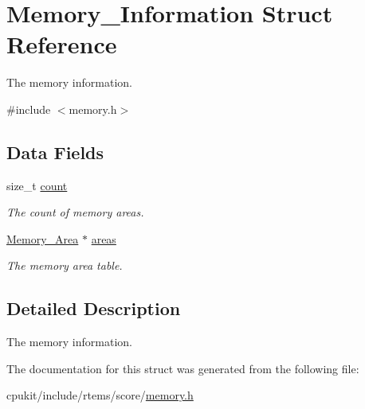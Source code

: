 \hypertarget{structMemory__Information}{}\section{Memory\+\_\+\+Information Struct Reference}
\label{structMemory__Information}


The memory information.  




{\ttfamily \#include $<$memory.\+h$>$}

\subsection*{Data Fields}
\begin{DoxyCompactItemize}
\item 
\mbox{\label{structMemory__Information_ab9e5516c1374c7484cb5d632da95269c}} 
size\+\_\+t \mbox{\hyperlink{structMemory__Information_ab9e5516c1374c7484cb5d632da95269c}{count}}
\begin{DoxyCompactList}\small\item\em The count of memory areas. \end{DoxyCompactList}\item 
\mbox{\label{structMemory__Information_a01619293117965934d3b2e265291da81}} 
\mbox{\hyperlink{structMemory__Area}{Memory\+\_\+\+Area}} $\ast$ \mbox{\hyperlink{structMemory__Information_a01619293117965934d3b2e265291da81}{areas}}
\begin{DoxyCompactList}\small\item\em The memory area table. \end{DoxyCompactList}\end{DoxyCompactItemize}


\subsection{Detailed Description}
The memory information. 

The documentation for this struct was generated from the following file\+:\begin{DoxyCompactItemize}
\item 
cpukit/include/rtems/score/\mbox{\hyperlink{rtems_2score_2memory_8h}{memory.\+h}}\end{DoxyCompactItemize}

